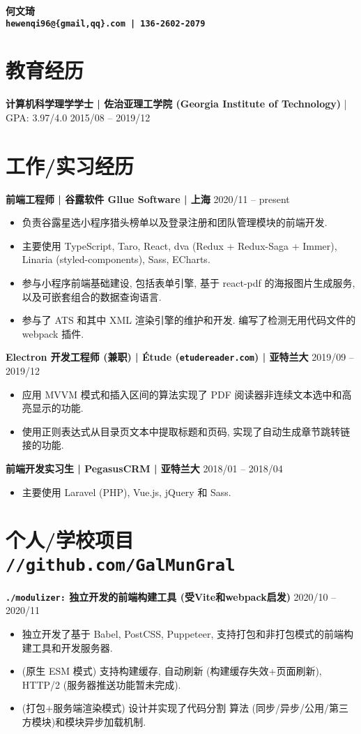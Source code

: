 \documentclass[10 pt]{article}
\begin{document}
\begin{center}
\textbf{\huge 何文琦}\\
\vspace{0.2em}
\textbf{\texttt{hewenqi96@\{gmail,qq\}.com | 136-2602-2079 }}
\end{center}

\section*{教育经历}
\textbf{计算机科学理学学士 | 佐治亚理工学院 (Georgia Institute of Technology)} | GPA: 3.97/4.0 \hfill 2015/08 -- 2019/12

\section*{工作/实习经历}
\textbf{前端工程师 | 谷露软件 Gllue Software | 上海} \hfill 2020/11 -- present
\begin{itemize}
\item 负责谷露星选小程序猎头榜单以及登录注册和团队管理模块的前端开发.
\item 主要使用 TypeScript, Taro, React, dva (Redux + Redux-Saga + Immer), Linaria (styled-components), Sass, ECharts.
\item 参与小程序前端基础建设, 包括表单引擎, 基于 react-pdf 的海报图片生成服务, 以及可嵌套组合的数据查询语言.
\item 参与了 ATS 和其中 XML 渲染引擎的维护和开发. 编写了检测无用代码文件的 webpack 插件.
\end{itemize}

\textbf{Electron 开发工程师 (兼职) | Étude (\texttt{etudereader.com}) | 亚特兰大} \hfill 2019/09 -- 2019/12
\begin{itemize}
\item 应用 MVVM 模式和插入区间的算法实现了 PDF 阅读器非连续文本选中和高亮显示的功能.
\item 使用正则表达式从目录页文本中提取标题和页码, 实现了自动生成章节跳转链接的功能.
\end{itemize}

\textbf{前端开发实习生 | PegasusCRM | 亚特兰大} \hfill 2018/01 -- 2018/04
\begin{itemize}
\item 主要使用 Laravel (PHP), Vue.js, jQuery 和 Sass.
\end{itemize} 

\section*{个人/学校项目 \texttt{\large //github.com/GalMunGral}}
\textbf{ \texttt{./modulizer:} 独立开发的前端构建工具 (受Vite和webpack启发) } \hfill 2020/10 -- 2020/11 
\begin{itemize}
\item 独立开发了基于 Babel, PostCSS, Puppeteer, 支持打包和非打包模式的前端构建工具和开发服务器.
\item (原生 ESM 模式) 支持构建缓存, 自动刷新 (构建缓存失效+页面刷新), HTTP/2 (服务器推送功能暂未完成).
\item (打包+服务端渲染模式) 设计并实现了代码分割 算法 (同步/异步/公用/第三方模块)和模块异步加载机制.
\end{itemize}
\end{document}

